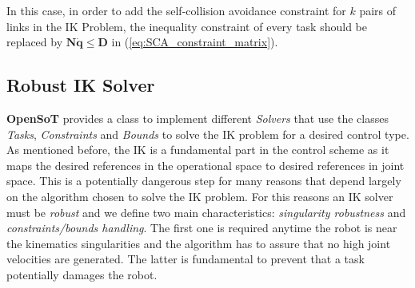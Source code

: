 In this case, in order to add the self-collision avoidance constraint for $ k $ pairs of links in the IK Problem, the inequality constraint of every task should be replaced by $ \bm{N} \dot{\bm{q}} \leq \bm{D} $ in (\ref{eq:SCA_constraint_matrix}).


\subsection{Robust IK Solver}
\label{sec:robust_ik_solver}
\textbf{OpenSoT} provides a class to implement different \emph{Solvers} that use the classes \emph{Tasks}, \emph{Constraints} and \emph{Bounds} to solve the IK problem for a desired control type.
As mentioned before, the IK is a fundamental part in the control scheme as it maps the desired references in the operational space to desired references in joint space. This is a potentially dangerous step for many reasons that depend largely on the algorithm chosen to solve the IK problem.
For this reasons an IK solver must be \emph{robust} and we define two main characteristics: \emph{singularity robustness} and \emph{constraints/bounds handling}.
The first one is required anytime the robot is near the kinematics singularities and the algorithm has to assure that no high joint velocities are generated.
The latter is fundamental to prevent that a task potentially damages the robot. 

